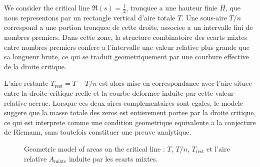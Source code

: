 \documentclass[a4paper,11pt]{article}
\begin{document}
We consider the critical line $\Re(s)=\tfrac{1}{2}$, tronquee a une
hauteur finie $H$, que nous representons par un rectangle vertical d'aire
totale $T$. Une sous-aire $T/n$ correspond a une portion tronquee de cette
droite, associee a un intervalle fini de nombres premiers. Dans cette zone,
la structure combinatoire des ecarts mixtes entre nombres premiers confere
a l'intervalle une valeur relative plus grande que sa longueur brute, ce
qui se traduit geometriquement par une courbure effective de la droite
critique.

L'aire restante $T_{\text{rest}} = T - T/n$ est alors mise en correspondance
avec l'aire situee entre la droite critique reelle et la courbe deformee
induite par cette valeur relative accrue. Lorsque ces deux aires
complementaires sont egales, le modele suggere que la masse totale des
zeros est entierement portee par la droite critique, ce qui est interprete
comme une condition geometrique equivalente a la conjecture de Riemann,
sans toutefois constituer une preuve analytique.

\begin{figure}[h]
  \centering
  \caption{Geometric model of areas on the critical line : $T$,
  $T/n$, $T_{\text{rest}}$ et l'aire relative $A_{\text{mixte}}$ induite
  par les ecarts mixtes.}
\end{figure}
\end{document}
